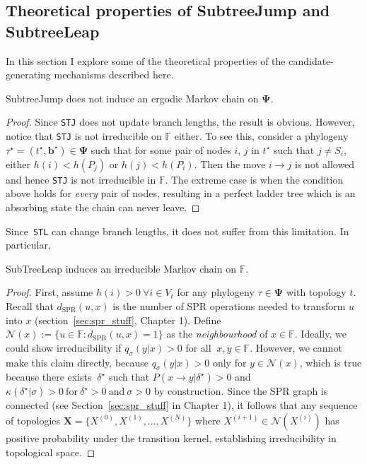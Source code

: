 \subsection{Theoretical properties of SubtreeJump and SubtreeLeap}
\label{sec:stx_properties}

In this section I explore some of the theoretical properties of the candidate-generating mechanisms described here.

\begin{remark}
\label{rmk:stj_ergodic}
 SubtreeJump does not induce an ergodic Markov chain on $\boldsymbol \Psi$.
 \end{remark}
\begin{proof}
 Since \verb|STJ| does not update branch lengths, the result is obvious.
 However, notice that \verb|STJ| is not irreducible on $\mathbb{F}$ either.
 To see this, consider a phylogeny $\tau^\star = (t^\star, \boldsymbol b^\star) \in \boldsymbol \Psi$ such that for some pair of nodes $i$, $j$  in $t^\star$ such that $j \neq S_i$, either $h(i) < h(P_j)$ or $h(j) < h(P_i)$.
 Then  the move $ i \to j$ is not allowed and hence \verb|STJ| is not irreducible in $\mathbb{F}$.
 The extreme case is when the condition above holds for \textit{every} pair of nodes, resulting in a perfect ladder tree which is an absorbing state the chain can never leave.
\end{proof}

Since~\verb|STL| can change branch lengths, it does not suffer from this limitation.
In particular,
\begin{remark}
\label{rmk:stl_irreducible_F}
 SubTreeLeap induces an irreducible Markov chain on $\mathbb{F}$.
 \end{remark}
\begin{proof}
First, assume $h(i) > 0 \: \forall i \in V_t$ for any phylogeny $\tau \in \boldsymbol \Psi$ with topology $t$.
Recall that $d_{\text{SPR}}(u, x)$ is the number of SPR operations needed to transform $u$ into $x$ (section~\ref{sec:spr_stuff}, Chapter 1).
Define $\mathcal{N}(x) := \{ u \in \mathbb{F} : d_{\text{SPR}}(u, x) = 1 \}$ as the \textit{neighbourhood} of $x \in \mathbb{F}$.
 Ideally, we could show irreducibility if $q_\sigma(y | x) > 0$ for all $\: x, y \in \mathbb{F}$.
 However, we cannot make this claim directly, because $q_\sigma(y | x) > 0$ only for $y \in \mathcal{N}(x)$, which is true because there exists $\: \delta^\star$ such that $P(x \rightarrow y | \delta^\star) > 0 $ and $\kappa(\delta^\star | \sigma) > 0 \: \text{for} \: \delta^\star > 0 \: \text{and} \: \sigma > 0$ by construction.
 Since the SPR graph is connected (see Section~\ref{sec:spr_stuff} in Chapter 1), it follows that any sequence of topologies $\boldsymbol X = \{ X^{(0)}, X^{(1)}, \ldots, X^{(N)}\}$ where $X^{(i + 1)} \in \mathcal{N}( X^{(i)})$ has positive probability under the transition kernel, establishing irreducibility in topological space.
\end{proof}

